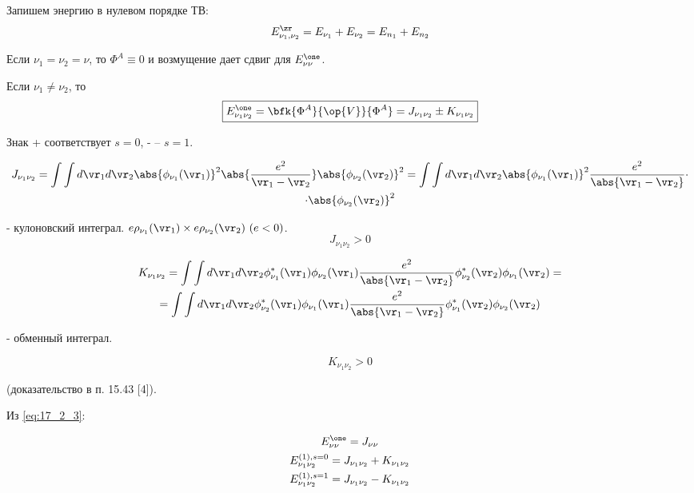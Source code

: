 Запишем энергию в нулевом порядке ТВ:
$$
E_{\nu_1, \nu_2}^\zr = E_{\nu_1} + E_{\nu_2} = E_{n_1} + E_{n_2}
$$

Если  $\nu_1 = \nu_2= \nu$, то $\Phi^A \equiv 0$ и возмущение дает сдвиг для $E_{\nu \nu}^\one$.

Если  $\nu_1 \not = \nu_2$, то
\begin{equation}
\label{eq:17_2_3}
\boxed{E_{\nu_1 \nu_2}^\one = \bfk{\Phi^A}{\op{V}}{\Phi^A} = J_{\nu_1 \nu_2} \pm K_{\nu_1 \nu_2}} 
\end{equation}

Знак + соответствует $s = 0$, - -- $s = 1$.

\begin{gather}
\label{eq:17_2_4}
J_{\nu_1 \nu_2} = \int \int d\vr_1 d\vr_2 \abs{\phi_{\nu_1}(\vr_1)}^2 \abs{\frac{e^2}{\vr_1 - \vr_2}} \abs{\phi_{\nu_2}(\vr_2)}^2 = \int \int d\vr_1 d\vr_2 \abs{\phi_{\nu_1}(\vr_1)}^2 \frac{e^2}{\abs{\vr_1 - \vr_2}} \cdot \nonumber \\ \cdot \abs{\phi_{\nu_2}(\vr_2)}^2
\end{gather}

- кулоновский интеграл. $e\rho_{\nu_1}(\vr_1) \times e\rho_{\nu_2}(\vr_2)~(e < 0)$.
$$
J_{\nu_1 \nu_2} > 0
$$

\begin{gather}
\label{eq:17_2_5}
K_{\nu_1 \nu_2} = \int \int d\vr_1 d\vr_2 \phi^*_{\nu_1}(\vr_1) \phi_{\nu_2}(\vr_1)\frac{e^2}{\abs{\vr_1 - \vr_2}}  \phi^*_{\nu_2}(\vr_2) \phi_{\nu_1}(\vr_2) = \nonumber \\
= \int \int d\vr_1 d\vr_2 \phi^*_{\nu_2}(\vr_1) \phi_{\nu_1}(\vr_1)\frac{e^2}{\abs{\vr_1 - \vr_2}}  \phi^*_{\nu_1}(\vr_2) \phi_{\nu_2}(\vr_2)
\end{gather}

- обменный интеграл.

$$
K_{\nu_1 \nu_2} > 0
$$

(доказательство в п. 15.43 [4]).

Из \eqref{eq:17_2_3}:

\begin{gather*}
E_{\nu\nu}^\one = J_{\nu\nu} \\
E_{\nu_1 \nu_2}^{(1), s=0} = J_{\nu_1\nu_2} + K_{\nu_1\nu_2} \\
E_{\nu_1 \nu_2}^{(1), s=1} = J_{\nu_1\nu_2} - K_{\nu_1\nu_2} 
\end{gather*}